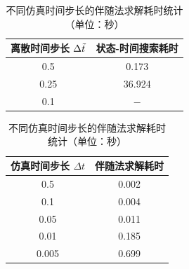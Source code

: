 \begin{table}[!tbh]
\begin{minipage}[!tbh]{\columnwidth}
\setlength{\belowcaptionskip}{0.4cm}
\renewcommand{\arraystretch}{1.7}
\centering
\caption[不同离散化时间步长的状态-时间搜索耗时统计]{
不同离散化时间步长的状态-时间搜索耗时统计（单位：秒）
}
\setlength{\tabcolsep}{3.3mm}
{
    \begin{tabular}{|c|c|}
    \hline
    \textbf{离散时间步长} $\Delta{\Tilde{t}}$ & \textbf{状态-时间搜索耗时} \\ \hline
    0.5                     & 0.173                  \\ \hline
    0.25                    & 36.924                 \\ \hline
    0.1                     & $-$                      \\ \hline
    \end{tabular}
}
\label{tab:keyframe_sttperformance}
\vspace{2mm}
\end{minipage}

\begin{minipage}[!tbh]{\columnwidth}
\setlength{\belowcaptionskip}{0.4cm}
\renewcommand{\arraystretch}{1.7}
\centering
\caption[不同仿真时间步长的伴随法求解耗时统计]{
不同仿真时间步长的伴随法求解耗时统计（单位：秒）
}
\setlength{\tabcolsep}{4.7mm}
{
    \begin{tabular}{|c|c|}
    \hline
    \textbf{仿真时间步长} $\Delta{t}$ & \textbf{伴随法求解耗时} \\ \hline
    0.5                 & 0.002                           \\ \hline
    0.1                 & 0.004                           \\ \hline
    0.05                & 0.011                           \\ \hline
    0.01                & 0.185                           \\ \hline
    0.005               & 0.699                           \\ \hline
    \end{tabular}
}
\label{tab:keyframe_adjperofmance}
\end{minipage}
\end{table}


